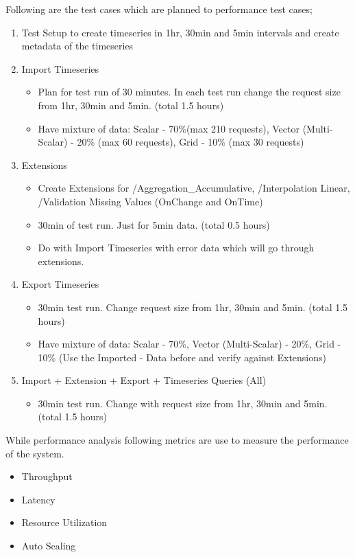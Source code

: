 Following are the test cases which are planned to performance test cases;
\begin{enumerate}
    \item Test Setup to create timeseries in 1hr, 30min and 5min intervals and create metadata of the timeseries
    \item Import Timeseries
    \begin{itemize}
        \item Plan for test run of 30 minutes. In each test run change the request size from 1hr, 30min and 5min. (total 1.5 hours)
        \item Have mixture of data: Scalar - 70\%(max 210 requests), Vector (Multi-Scalar) - 20\% (max 60 requests), Grid - 10\% (max 30 requests)
    \end{itemize}
    \item Extensions
    \begin{itemize}
        \item Create Extensions for /Aggregation\_Accumulative, /Interpolation Linear, /Validation Missing Values (OnChange and OnTime)
        \item 30min of test run. Just for 5min data. (total 0.5 hours)
        \item Do with Import Timeseries with error data which will go through extensions.
    \end{itemize}
    \item Export Timeseries
    \begin{itemize}
        \item 30min test run. Change request size from 1hr, 30min and 5min. (total 1.5 hours)
        \item Have mixture of data: Scalar - 70\%, Vector (Multi-Scalar) - 20\%, Grid - 10\% (Use the Imported - Data before and verify against Extensions)
    \end{itemize}
    \item Import + Extension + Export + Timeseries Queries (All)
    \begin{itemize}
        \item 30min test run. Change with request size from 1hr, 30min and 5min. (total 1.5 hours)
    \end{itemize}
\end{enumerate}

While performance analysis following metrics are use to measure the performance of the system.
\begin{itemize}
    \item Throughput
    \item Latency
    \item Resource Utilization
    \item Auto Scaling
\end{itemize}
